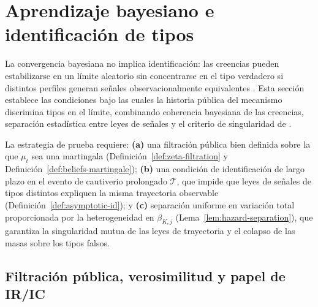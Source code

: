 \documentclass[12pt]{article}
\providecommand{\textcite}{\citet}
\theoremstyle{definition}
\theoremstyle{remark}
\newcommand{\1}{\mathbf{1}}
\begin{document}
\section{Aprendizaje bayesiano e identificación de tipos}
\label{sec:asymptotic-learning}

La convergencia bayesiana no implica identificación: las creencias pueden estabilizarse en un límite aleatorio sin concentrarse en el tipo verdadero si distintos perfiles generan señales observacionalmente equivalentes \textcite{Doob1953Stochastic,Williams1991Martingales,Schervish1995Theory}. Esta sección establece las condiciones bajo las cuales la historia pública del mecanismo discrimina tipos en el límite, combinando coherencia bayesiana de las creencias, separación estadística entre leyes de señales y el criterio de singularidad de \textcite{Kakutani1948,BlackwellDubins1962}.

La estrategia de prueba requiere: \textbf{(a)} una filtración pública bien definida sobre la que $\mu_t$ sea una martingala \textup{(}Definición~\ref{def:zeta-filtration} y Definición~\ref{def:beliefs-martingale}\textup{)}; \textbf{(b)} una condición de identificación de largo plazo en el evento de cautiverio prolongado $\mathcal{T}$, que impide que leyes de señales de tipos distintos expliquen la misma trayectoria observable \textup{(}Definición~\ref{def:asymptotic-id}\textup{)}; y \textbf{(c)} separación uniforme en variación total proporcionada por la heterogeneidad en $\beta_{K,j}$ \textup{(}Lema~\ref{lem:hazard-separation}\textup{)}, que garantiza la singularidad mutua de las leyes de trayectoria y el colapso de las masas sobre los tipos falsos.

\subsection{Filtración pública, verosimilitud y papel de IR/IC}
\label{subsec:P-IR-IC-convergence-mu}
\end{document}

